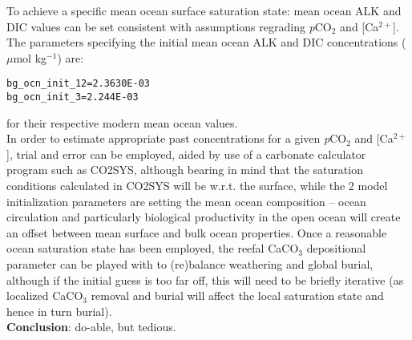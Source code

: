 \documentclass[10pt,twoside]{article}
\begin{document}
\begin{compactenum}

        \item To achieve a specific mean ocean surface saturation state: mean ocean ALK and DIC values can be set consistent with assumptions regrading \textit{p}CO\(_{2}\) and [Ca\(^{2+}\)]. The parameters specifying the initial mean ocean ALK and DIC concentrations (\(\mu\)mol kg\(^{-1}\)) are:
\vspace{-5pt}\begin{verbatim}
bg_ocn_init_12=2.3630E-03
bg_ocn_init_3=2.244E-03
\end{verbatim}\vspace{-5pt}
for their respective modern mean ocean values.
\\ In order to estimate appropriate past concentrations for a given \textit{p}CO\(_{2}\)  and [Ca\(^{2+}\)], trial and error can be employed, aided by use of a carbonate calculator program such as CO2SYS, although bearing in mind that the saturation conditions calculated in CO2SYS will be w.r.t. the surface, while the 2 model initialization parameters are setting the mean ocean composition -- ocean circulation and particularly biological productivity in the open ocean will create an offset between mean surface and bulk ocean properties.
Once a reasonable ocean saturation state has been employed, the reefal CaCO$_{3}$ depositional parameter can be played with to (re)balance weathering and global burial, although if the initial guess is too far off, this will need to be briefly iterative (as localized CaCO$_{3}$ removal and burial will affect the local saturation state and hence in turn burial).
\\ \textbf{Conclusion}: do-able, but tedious.
        

\end{compactenum}
\end{document}
